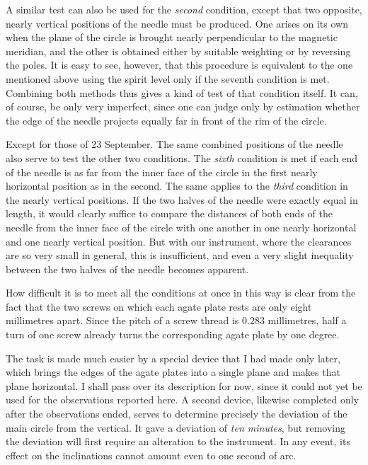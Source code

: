 A similar test can also be used for the \textit{second} condition, except that two opposite, nearly vertical positions of the needle must be produced. One arises on its own when the plane of the circle is brought nearly perpendicular to the magnetic meridian, and the other is obtained either by suitable weighting or by reversing the poles. It is easy to see, however, that this procedure is equivalent to the one mentioned above using the spirit level only if the seventh condition is met. Combining both methods thus gives a kind of test of that condition itself. It can, of course, be only very imperfect, since one can judge only by estimation whether the edge of the needle projects equally far in front of the rim of the circle.

\expandafter\def\csname HistoricalNoteText454\endcsname{Except for those of 23 September.}%
The same combined positions of the needle also serve to test the other two conditions. The \textit{sixth} condition is met if each end of the needle is as far from the inner face of the circle in the first nearly horizontal position as in the second. The same applies to the \textit{third} condition in the nearly vertical positions. If the two halves of the needle were exactly equal in length, it would clearly suffice to compare the distances of both ends of the needle from the inner face of the circle with one another in one nearly horizontal and one nearly vertical position. But with our instrument, where the clearances are so very small in general, this is insufficient, and even a very slight inequality between the two halves of the needle becomes apparent.

How difficult it is to meet all the conditions at once in this way is clear from the fact that the two screws on which each agate plate rests are only eight millimetres apart. Since the pitch of a screw thread is $0.283$ millimetres, half a turn of one screw already turns the corresponding agate plate by one degree.

The task is made much easier by a special device that I had made only later, which brings the edges of the agate plates into a single plane and makes that plane horizontal. I shall pass over its description for now, since it could not yet be used for the observations reported here. A second device, likewise completed only after the observations ended, serves to determine precisely the deviation of the main circle from the vertical. It gave a deviation of \textit{ten minutes}, but removing the deviation will first require an alteration to the instrument. In any event, its effect on the inclinations cannot amount even to one second of arc.

